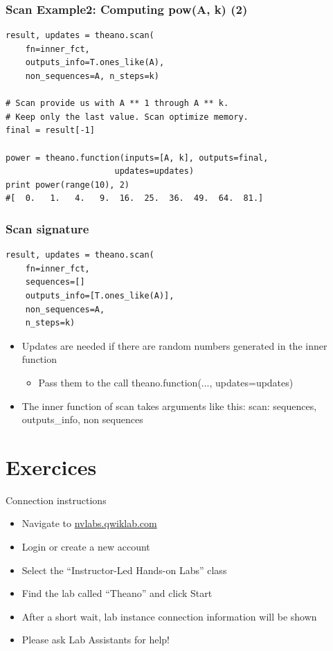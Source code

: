 \documentclass[utf8x,xcolor=pdftex,dvipsnames,table]{beamer}
\begin{document}
\begin{frame}[fragile]
  \frametitle{Scan Example2: Computing pow(A, k) (2)}

\begin{lstlisting}
result, updates = theano.scan(
    fn=inner_fct,
    outputs_info=T.ones_like(A),
    non_sequences=A, n_steps=k)

# Scan provide us with A ** 1 through A ** k.
# Keep only the last value. Scan optimize memory.
final = result[-1]

power = theano.function(inputs=[A, k], outputs=final,
                      updates=updates)
print power(range(10), 2)
#[  0.   1.   4.   9.  16.  25.  36.  49.  64.  81.]
\end{lstlisting}
\end{frame}

\begin{frame}[fragile]
  \frametitle{Scan signature}

\begin{lstlisting}
result, updates = theano.scan(
    fn=inner_fct,
    sequences=[]
    outputs_info=[T.ones_like(A)],
    non_sequences=A,
    n_steps=k)
\end{lstlisting}

\begin{itemize}
\item Updates are needed if there are random numbers generated in the inner function
\begin{itemize}
\item Pass them to the call theano.function(..., updates=updates)
\end{itemize}
\item The inner function of scan takes arguments like this:
   scan: sequences, outputs\_info, non sequences
\end{itemize}

\end{frame}

\section{Exercices}
\begin{frame}{Connection instructions}
\begin{itemize}
\item Navigate to \url{nvlabs.qwiklab.com}
\item Login or create a new account
\item Select the ``Instructor-Led Hands-on Labs'' class
\item Find the lab called ``Theano'' and click Start
\item After a short wait, lab instance connection information will be shown
\item Please ask Lab Assistants for help!
\end{itemize}
\end{frame}
\end{document}
